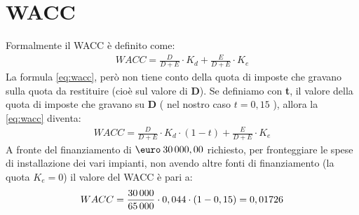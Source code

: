 \section[WACC]{WACC}
	Formalmente il \ac{WACC} è definito come:	
	\begin{equation}
	\label{eq:wacc}
	\begin{split}
		WACC = \frac{D}{D+E} \cdot K_d + \frac{E}{D+E} \cdot K_e 
	\end{split}
	\end{equation}
	La formula \ref{eq:wacc}, però non tiene conto della quota di imposte che gravano sulla quota da restituire (cioè sul valore di \textbf{D}). \newline 
	Se definiamo con \textbf{t}, il valore della quota di imposte che gravano su \textbf{D} ( nel nostro caso $ t = 0,15 $ ), allora la \ref{eq:wacc} diventa:
	\begin{equation}
	\label{eq:wacc_tax}
	\begin{split}
		WACC = \frac{D}{D+E} \cdot K_d \cdot ( 1 - t ) + \frac{E}{D+E} \cdot K_e 
	\end{split}
	\end{equation}	
	A fronte del finanziamento di $\mbox{\euro} \: 30\thinspace 000,00$ richiesto, per fronteggiare le spese di installazione dei vari impianti, non avendo altre fonti di finanziamento (la quota $K_e = 0$) il valore del \ac{WACC} è pari a:
	\begin{equation}
	\label{eq:wacc_tax_value}
	\begin{split}
		WACC = \frac{30\thinspace 000}{65\thinspace 000} \cdot 0,044 \cdot ( 1 - 0,15 ) = 0,01726 
	\end{split}
	\end{equation}